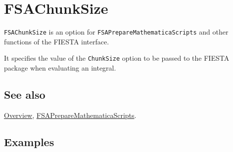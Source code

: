 \documentclass[../FeynHelpersManual.tex]{subfiles}
\begin{document}
\begin{Shaded}
\begin{Highlighting}[]
 
\end{Highlighting}
\end{Shaded}

\hypertarget{fsachunksize}{
\section{FSAChunkSize}\label{fsachunksize}}

\texttt{FSAChunkSize} is an option for
\texttt{FSAPrepareMathematicaScripts} and other functions of the FIESTA
interface.

It specifies the value of the \texttt{ChunkSize} option to be passed to
the FIESTA package when evaluating an integral.

\subsection{See also}

\hyperlink{toc}{Overview},
\hyperlink{fsapreparemathematicascripts}{FSAPrepareMathematicaScripts}.

\subsection{Examples}
\end{document}
